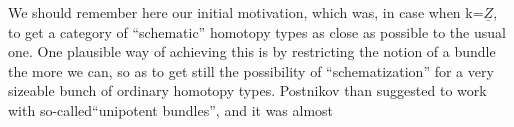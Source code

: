 We should remember here our initial motivation, which was, in
case when k=$\underline{Z}$, to get a category of  ``schematic'' homotopy
types as close as possible to the usual one. One plausible way of
achieving this is by restricting the notion of a bundle the more we
can, so as to get still the possibility of ``schematization'' for a very
sizeable bunch of ordinary homotopy types. Postnikov  than
suggested to work with so-called``unipotent bundles'', and it was almost

